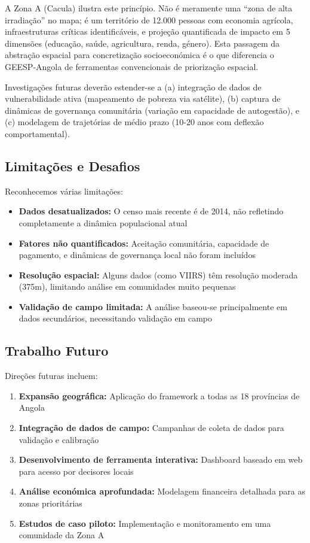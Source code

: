 \documentclass[12pt, a4paper]{article}
\begin{document}
A Zona A (Cacula) ilustra este princípio. Não é meramente uma ``zona de alta irradiação'' 
no mapa; é um território de 12.000 pessoas com economia agrícola, infraestruturas críticas 
identificáveis, e projeção quantificada de impacto em 5 dimensões (educação, saúde, 
agricultura, renda, género). Esta passagem da abstração espacial para concretização 
socioeconómica é o que diferencia o GEESP-Angola de ferramentas convencionais de 
priorização espacial.

Investigações futuras deverão estender-se a (a) integração de dados de vulnerabilidade 
ativa (mapeamento de pobreza via satélite), (b) captura de dinâmicas de governança 
comunitária (variação em capacidade de autogestão), e (c) modelagem de trajetórias 
de médio prazo (10-20 anos com deflexão comportamental).

\subsection{Limitações e Desafios}

Reconhecemos várias limitações:
\begin{itemize}
    \item \textbf{Dados desatualizados:} O censo mais recente é de 2014, não refletindo completamente a dinâmica populacional atual
    \item \textbf{Fatores não quantificados:} Aceitação comunitária, capacidade de pagamento, e dinâmicas de governança local não foram incluídos
    \item \textbf{Resolução espacial:} Alguns dados (como VIIRS) têm resolução moderada (375m), limitando análise em comunidades muito pequenas
    \item \textbf{Validação de campo limitada:} A análise baseou-se principalmente em dados secundários, necessitando validação em campo
\end{itemize}

\subsection{Trabalho Futuro}

Direções futuras incluem:
\begin{enumerate}
    \item \textbf{Expansão geográfica:} Aplicação do framework a todas as 18 províncias de Angola
    \item \textbf{Integração de dados de campo:} Campanhas de coleta de dados para validação e calibração
    \item \textbf{Desenvolvimento de ferramenta interativa:} Dashboard baseado em web para acesso por decisores locais
    \item \textbf{Análise económica aprofundada:} Modelagem financeira detalhada para as zonas prioritárias
    \item \textbf{Estudos de caso piloto:} Implementação e monitoramento em uma comunidade da Zona A
\end{enumerate}
\end{document}

